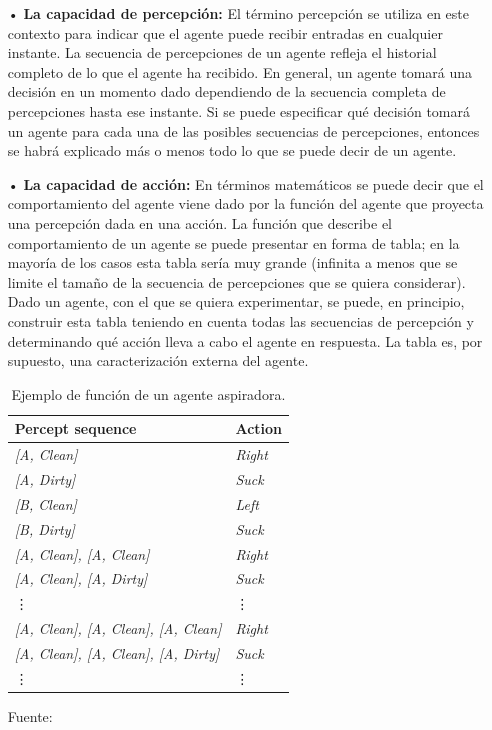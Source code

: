 \begin{itemize}
\item[•] {\bf La capacidad de percepción:}
\vskip 0.1cm El término percepción se utiliza en este contexto para indicar que el agente puede recibir entradas en cualquier instante. La secuencia de percepciones de un agente refleja el historial completo de lo que el agente ha recibido. En general, un agente tomará una decisión en un momento dado dependiendo de la secuencia completa de percepciones hasta ese instante. Si se puede especificar qué decisión tomará un agente para cada una de las posibles secuencias de percepciones, entonces se habrá explicado más o menos todo lo que se puede decir de un agente.

\item[•] {\bf La capacidad de acción:}
\vskip 0.1cm En términos matemáticos se puede decir que el comportamiento del agente viene dado por la función del agente que proyecta una percepción dada en una acción. La función que describe el comportamiento de un agente se puede presentar en forma de tabla; en la mayoría de los casos esta tabla sería muy grande (infinita a menos que se limite el tamaño de la secuencia de percepciones que se quiera considerar). Dado un agente, con el que se quiera experimentar, se puede, en principio, construir esta tabla teniendo en cuenta todas las secuencias de percepción y determinando qué acción lleva a cabo el agente en respuesta. La tabla es, por supuesto, una caracterización externa del agente. 

\begin{table}[ht!]
\centering
\caption{Ejemplo de función de un agente aspiradora.} \vskip 0.1cm
\begin{tabular}{|l|l|}  \hline 
Percept sequence & Action \\ \hline 
\it [A, Clean] & \it Right \\ \it [A, Dirty] & \it Suck \\ \it [B, Clean] & \it Left \\ \it [B, Dirty] & \it Suck \\ \it [A, Clean], \it [A, Clean] & \it Right \\ \it [A, Clean], \it [A, Dirty] & \it Suck \\ \vdots & \vdots \\ \it [A, Clean], \it[A, Clean], \it[A, Clean] & \it Right \\ \it [A, Clean], \it[A, Clean], \it[A, Dirty] & \it Suck \\ \vdots & \vdots \\ \hline
\end{tabular} 
\begin{center}
{\small{Fuente: \cite{FALTA}}}
\end{center}
\end{table}


\end{itemize}
